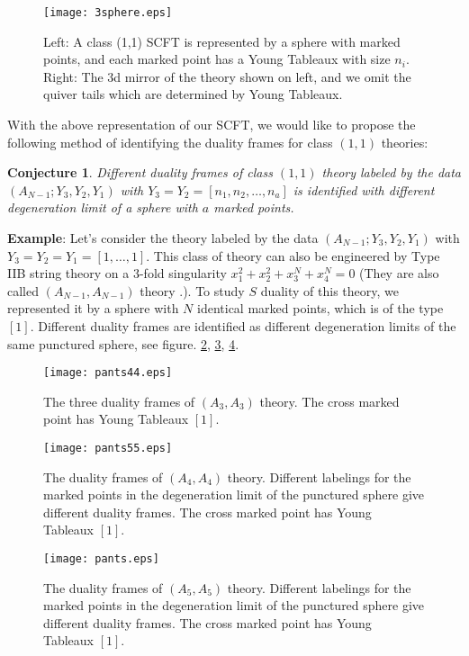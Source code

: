 \documentclass[a4paper,11pt]{article}
\newtheorem{conjecture}{Conjecture}
\begin{document}
\begin{figure}[h]
\centering
  \texttt{[image: 3sphere.eps]}
  \caption{Left: A class (1,1) SCFT is represented by a sphere with marked points, and each marked point has a Young Tableaux with size $n_i$. Right: The 3d mirror of the theory shown on left, and 
  we omit the quiver tails which are determined by Young Tableaux.}
  \label{oneone}
\end{figure}

With the above representation of our SCFT,  we would like to propose the following method of identifying the duality frames for class $(1,1)$ theories:

\begin{conjecture}
Different duality frames of class $(1,1)$ theory labeled by the data $(A_{N-1};Y_3, Y_2, Y_1)$ with $Y_3=Y_2=[n_1, n_2,\ldots, n_a]$  is identified with different degeneration limit of a sphere with $a$ marked points. 
\end{conjecture}


\textbf{Example}:  Let's consider the theory labeled by the data  $(A_{N-1};Y_3, Y_2, Y_1)$ with $Y_3=Y_2=Y_1=[1, \ldots, 1]$. This class of theory can also be engineered by Type IIB string theory on 
a 3-fold singularity $x_1^2+x_2^2+x_3^N+x_4^N=0$ (They are also called $(A_{N-1}, A_{N-1})$ theory \cite{Cecotti:2010fi}.). To study $S$ duality of this theory, we  represented it by a sphere with $N$ identical marked points, which is of the type $[1]$.  Different duality frames 
are identified as different degeneration limits of the same punctured sphere, see figure. \ref{N1}, \ref{N2}, \ref{N3}. 
\begin{figure}[h]
\centering
  \texttt{[image: pants44.eps]}
  \caption{The three duality frames of $(A_3, A_3)$ theory. The cross marked point has Young Tableaux $[1]$. }
  \label{N1}
\end{figure}
\begin{figure}[h]
\centering
  \texttt{[image: pants55.eps]}
  \caption{The  duality frames of $(A_4, A_4)$ theory. Different labelings for the marked points in the degeneration limit of the punctured sphere give different duality frames. The cross marked point has Young Tableaux $[1]$.}
  \label{N2}
\end{figure}
\begin{figure}[h]
\centering
  \texttt{[image: pants.eps]}
  \caption{The  duality frames of $(A_5, A_5)$ theory. Different labelings for the marked points in the degeneration limit of the punctured sphere give different duality frames. The cross marked point has Young Tableaux $[1]$.}
  \label{N3}
\end{figure}
\end{document}
